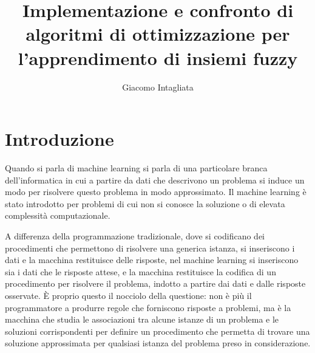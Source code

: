 \documentclass[a4paper,12pt]{report}
\begin{document}
\title{Implementazione e confronto di algoritmi di ottimizzazione per l'apprendimento di insiemi fuzzy}
\author{Giacomo Intagliata}
%
% 
%
\beforepreface

%
%
\afterpreface

%
\chapter*{Introduzione}
\label{Introduzione}

Quando si parla di machine learning si parla di una particolare branca dell'informatica in cui a partire da dati che descrivono un problema si induce un modo per risolvere questo problema in modo approssimato. Il machine learning è stato introdotto per problemi di cui non si conosce la soluzione o di elevata complessità computazionale.

A differenza della programmazione tradizionale, dove si codificano dei procedimenti che permettono di risolvere una generica istanza, si inseriscono i dati e la macchina restituisce delle risposte, nel machine learning si inseriscono sia i dati che le risposte attese, e la macchina restituisce la codifica di un procedimento per risolvere il problema, indotto a partire dai dati e dalle risposte osservate. \`E proprio questo il nocciolo della questione: non è più il programmatore a produrre regole che forniscono risposte a problemi, ma è la macchina che studia le associazioni tra alcune istanze di un problema e le soluzioni corrispondenti per definire un procedimento che permetta di trovare una soluzione approssimata per qualsiasi istanza del problema preso in considerazione.
\end{document}
